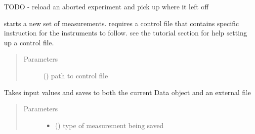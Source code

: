 \documentclass[letterpaper,10pt,english]{sphinxmanual}
\begin{document}
\begin{fulllineitems}
\begin{fulllineitems}
\end{fulllineitems}


\begin{fulllineitems}
\label{\detokenize{laboratory:laboratory.Setup.restart_from_backup}}
TODO - reload an aborted experiment and pick up where it left off

\end{fulllineitems}


\begin{fulllineitems}
\label{\detokenize{laboratory:laboratory.Setup.run}}
starts a new set of measurements. requires a control file that contains
specific instruction for the instruments to follow. see the tutorial section
for help setting up a control file.
\begin{quote}\begin{description}
\item[{Parameters}] \leavevmode
{} () \textendash{} path to control file

\end{description}\end{quote}

\end{fulllineitems}


\begin{fulllineitems}
\label{\detokenize{laboratory:laboratory.Setup.save_data}}
Takes input values and saves to both the current Data object and an external file
\begin{quote}\begin{description}
\item[{Parameters}] \leavevmode\begin{itemize}
\item {} 
 () \textendash{} type of measurement being saved


\end{itemize}
\end{description}
\end{quote}
\end{fulllineitems}
\end{fulllineitems}
\end{document}
